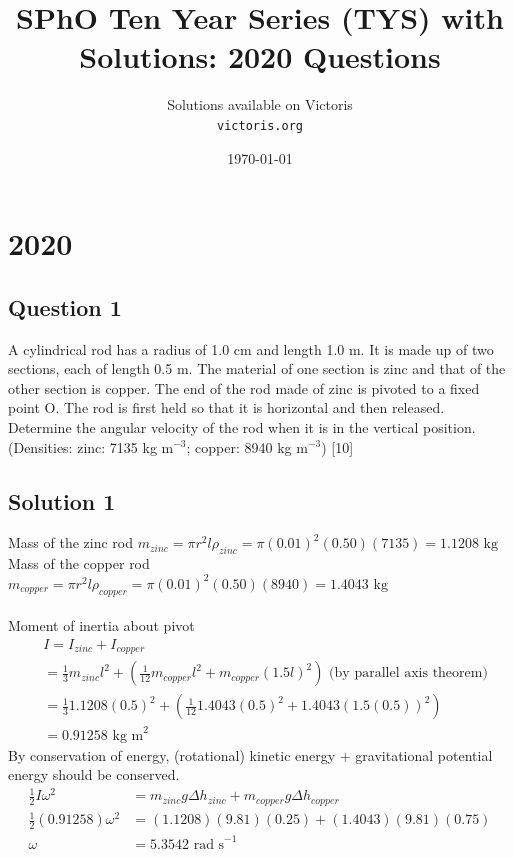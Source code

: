\documentclass{article}
\title{SPhO Ten Year Series (TYS) with Solutions: 2020 Questions}
\author{
    Solutions available on Victoris\\
    \texttt{victoris.org}
}
\date{\today}
\begin{document}
\maketitle

\section{2020}
\subsection{Question 1}
A cylindrical rod has a radius of 1.0 cm and length 1.0 m. It is made up of two sections, each of length 0.5 m. The material of one section is zinc and that of the other section is copper. The end of the rod made of zinc is pivoted to a fixed point O. The rod is first held so that it is horizontal and then released. Determine the angular velocity of the rod when it is in the vertical position. (Densities: zinc: 7135 kg $\text{m}^{-3}$; copper: 8940 kg $\text{m}^{-3}$) [10]

\subsection{Solution 1}
Mass of the zinc rod $m_{zinc} = \pi r^2 l \rho_{zinc} = \pi (0.01)^2 (0.50) (7135) = 1.1208 \text{ kg}$ \\
Mass of the copper rod $m_{copper} = \pi r^2 l \rho_{copper} = \pi (0.01)^2 (0.50) (8940) = 1.4043 \text{ kg}$ \\
\\ Moment of inertia about pivot 
\begin{align}
	&I=I_{zinc} + I_{copper}\\
	&=\frac{1}{3} m_{zinc} l^2 + \left(\frac{1}{12} m_{copper} l^2 + m_{copper} (1.5l)^2\right) \text{ (by parallel axis theorem)} \\
	&= \frac{1}{3} 1.1208 (0.5)^2 + \left(\frac{1}{12} 1.4043 (0.5)^2 + 1.4043 (1.5(0.5))^2\right) \\
	&= 0.91258 \text{ kg m}^2
\end{align}
By conservation of energy, (rotational) kinetic energy + gravitational potential energy should be conserved.
\begin{align}
	\frac{1}{2} I \omega^2 &= m_{zinc}g \Delta h_{zinc} + m_{copper}g \Delta h_{copper} \\
	\frac{1}{2}(0.91258) \omega^2 &= (1.1208)(9.81)(0.25) + (1.4043)(9.81)(0.75) \\
	\omega &= 5.3542 \text{ rad s}^{-1}
\end{align}
\end{document}
